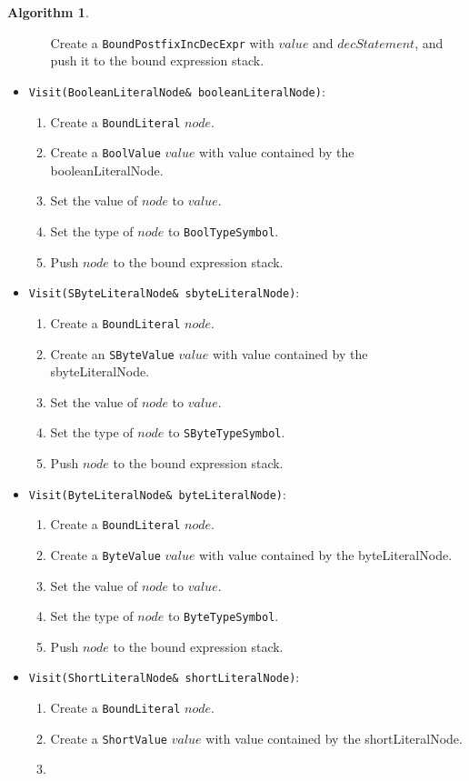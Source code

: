 \documentclass[a4paper,oneside,11pt]{book}
\theoremstyle{definition}
\newtheorem{algo}{Algorithm}[section]
\begin{document}
\begin{algo}
\begin{itemize}
\begin{enumerate}
Create a \verb|BoundPostfixIncDecExpr| with $value$ and $decStatement$, and push it to the bound expression stack.
\end{enumerate}
\item
\verb|Visit(BooleanLiteralNode& booleanLiteralNode)|:
\begin{enumerate}
\item
Create a \verb|BoundLiteral| $node$.
\item
Create a \verb|BoolValue| $value$ with value contained by the booleanLiteralNode.
\item
Set the value of $node$ to $value$.
\item
Set the type of $node$ to \verb|BoolTypeSymbol|.
\item
Push $node$ to the bound expression stack.
\end{enumerate}
\item
\verb|Visit(SByteLiteralNode& sbyteLiteralNode)|:
\begin{enumerate}
\item
Create a \verb|BoundLiteral| $node$.
\item
Create an \verb|SByteValue| $value$ with value contained by the sbyteLiteralNode.
\item
Set the value of $node$ to $value$.
\item
Set the type of $node$ to \verb|SByteTypeSymbol|.
\item
Push $node$ to the bound expression stack.
\end{enumerate}
\item
\verb|Visit(ByteLiteralNode& byteLiteralNode)|:
\begin{enumerate}
\item
Create a \verb|BoundLiteral| $node$.
\item
Create a \verb|ByteValue| $value$ with value contained by the byteLiteralNode.
\item
Set the value of $node$ to $value$.
\item
Set the type of $node$ to \verb|ByteTypeSymbol|.
\item
Push $node$ to the bound expression stack.
\end{enumerate}
\item
\verb|Visit(ShortLiteralNode& shortLiteralNode)|:
\begin{enumerate}
\item
Create a \verb|BoundLiteral| $node$.
\item
Create a \verb|ShortValue| $value$ with value contained by the shortLiteralNode.
\item

\end{enumerate}
\end{itemize}
\end{algo}
\end{document}
